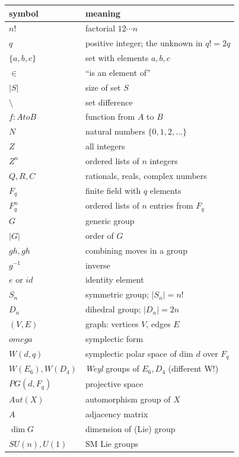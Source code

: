 \documentclass[11pt]{article}
\def\mathbb#1{#1}%
\def\mathrm#1{#1}%
\def\omega{omega}%
\def\cdot{ }%
\def\to{ to }%
\begin{document}
\begin{center}
\renewcommand{\arraystretch}{1.15}
\begin{tabular}{l l}
\toprule
symbol & meaning \\
\midrule
$n!$ & factorial $1 \cdot 2 \cdots n$ \\
$q$ & positive integer; the unknown in $q! = 2q$ \\
$\{a, b, c\}$ & set with elements $a, b, c$ \\
$\in$ & ``is an element of'' \\
$|S|$ & size of set $S$ \\
$\setminus$ & set difference \\
$f: A \to B$ & function from $A$ to $B$ \\
$\mathbb{N}$ & natural numbers $\{0, 1, 2, \ldots\}$ \\
$\mathbb{Z}$ & all integers \\
$\mathbb{Z}^n$ & ordered lists of $n$ integers \\
$\mathbb{Q}, \mathbb{R}, \mathbb{C}$ & rationals, reals, complex numbers \\
$\mathbb{F}_q$ & finite field with $q$ elements \\
$\mathbb{F}_q^n$ & ordered lists of $n$ entries from $\mathbb{F}_q$ \\
$G$ & generic group \\
$|G|$ & order of $G$ \\
$g \cdot h, gh$ & combining moves in a group \\
$g^{-1}$ & inverse \\
$e$ or $\mathrm{id}$ & identity element \\
$S_n$ & symmetric group; $|S_n| = n!$ \\
$D_n$ & dihedral group; $|D_n| = 2n$ \\
$(V, E)$ & graph: vertices $V$, edges $E$ \\
$\omega$ & symplectic form \\
$W(d, q)$ & symplectic polar space of dim $d$ over $\mathbb{F}_q$ \\
$W(E_6), W(D_4)$ & \emph{Weyl} groups of $E_6, D_4$ (different W!) \\
$\mathrm{PG}(d, \mathbb{F}_q)$ & projective space \\
$\mathrm{Aut}(X)$ & automorphism group of $X$ \\
$A$ & adjacency matrix \\
$\dim G$ & dimension of (Lie) group \\
$SU(n), U(1)$ & SM Lie groups \\

\end{tabular}
\end{center}
\end{document}
